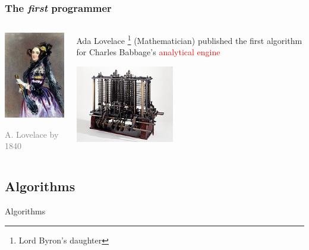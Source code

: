 \documentclass{beamer}
\newcommand{\light}[1]{\textcolor{gray}{#1}}
\newcommand{\red}[1]{\textcolor{red}{#1}}
\begin{document}
\begin{frame}
\frametitle{The \textit{first} programmer}

\begin{columns}
\begin{column}{0.4\textwidth}
\begin{center}
\includegraphics[width=43mm]{img/Ada_Lovelace_portrait.jpg}

\footnotesize
\light{A. Lovelace by 1840}
\end{center}
\end{column}

\begin{column}{0.55\textwidth}

\alert{Ada Lovelace}%
\footnote{Lord Byron’s daughter}
(Mathematician) published the first algorithm for Charles 
Babbage’s \red{analytical engine}

\begin{center}
\includegraphics[width=43mm]{img/Babbages_Analytical_Engine_1834-1871.jpg}
\end{center}

\end{column}
\end{columns}
\end{frame}


\begin{frame}
\section{Algorithms}
\centering
\alert{Algorithms}
\end{frame}
\end{document}
